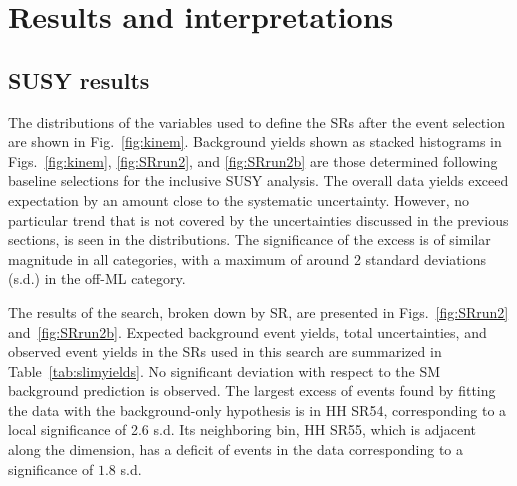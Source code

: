 \chapter{Results and interpretations}
\label{sec:results}


\section{SUSY results}
\label{sec:ssresults}

The distributions of the variables used to define the SRs after the event selection are
shown in Fig.~\ref{fig:kinem}.
Background yields shown as stacked histograms in Figs.~\ref{fig:kinem}, \ref{fig:SRrun2}, and \ref{fig:SRrun2b} are
those determined following baseline selections for the inclusive SUSY analysis.
The overall data yields exceed expectation by an amount close to the systematic uncertainty.
However, no particular trend that is not covered by the uncertainties discussed in the previous sections,
is seen in the distributions.
The significance of the excess is of similar magnitude in all categories, with a maximum of around 2 standard deviations (s.d.) in the off-\PZ ML category. 

The results of the search, broken down by SR,
are presented in Figs.~\ref{fig:SRrun2} and~\ref{fig:SRrun2b}.
Expected background event yields, total uncertainties, and observed event yields in the SRs used in this search
are summarized in Table~\ref{tab:slimyields}.
No significant deviation with respect to the SM background prediction is observed.
The largest excess of events found by fitting the data with the background-only
hypothesis is in HH SR54,
corresponding to a local significance of 2.6 s.d.
Its neighboring bin, HH SR55, which is adjacent along the \HT dimension, has a
deficit of events in the data corresponding to a
significance of $1.8$ s.d.

